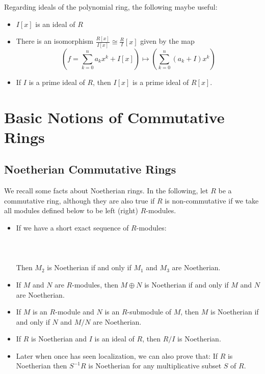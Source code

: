 \documentclass[a4paper]{article}
\begin{document}
Regarding ideals of the polynomial ring, the following maybe useful: 
\begin{itemize}
\item $I[x]$ is an ideal of $R$
\item There is an isomorphism $\frac{R[x]}{I[x]}\cong\frac{R}{I}[x]$ given by the map $$\left(f=\sum_{k=0}^na_kx^k+I[x]\right)\mapsto\left(\sum_{k=0}^n(a_k+I)x^k\right)$$
\item If $I$ is a prime ideal of $R$, then $I[x]$ is a prime ideal of $R[x]$. 
\end{itemize}

\pagebreak
\section{Basic Notions of Commutative Rings}
\subsection{Noetherian Commutative Rings}
We recall some facts about Noetherian rings. In the following, let $R$ be a commutative ring, although they are also true if $R$ is non-commutative if we take all modules defined below to be left (right) $R$-modules. 

\begin{itemize}
\item If we have a short exact sequence of $R$-modules: \\~\\
\\~\\
Then $M_2$ is Noetherian if and only if $M_1$ and $M_3$ are Noetherian. 
\item If $M$ and $N$ are $R$-modules, then $M\oplus N$ is Noetherian if and only if $M$ and $N$ are Noetherian. 
\item If $M$ is an $R$-module and $N$ is an $R$-submodule of $M$, then $M$ is Noetherian if and only if $N$ and $M/N$ are Noetherian.
\item If $R$ is Noetherian and $I$ is an ideal of $R$, then $R/I$ is Noetherian. 
\item Later when once has seen localization, we can also prove that: If $R$ is Noetherian then $S^{-1}R$ is Noetherian for any multiplicative subset $S$ of $R$. 
\end{itemize}
\end{document}
